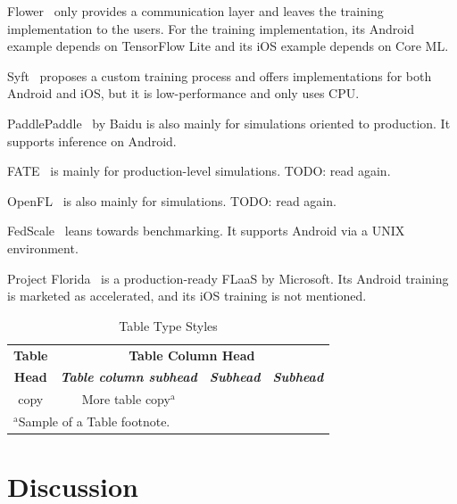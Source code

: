 \documentclass[conference]{IEEEtran}
\begin{document}
Flower~\cite{beutel2020flower,mathur2021ondevice}
only provides a communication layer and
leaves the training implementation to the users.
For the training implementation,
its Android example depends on TensorFlow Lite and
its iOS example depends on Core ML.

Syft~\cite{ryffel2018generic,Ziller2021,hall2021syft}
proposes a custom training process and
offers implementations for both Android and iOS,
but it is low-performance and only uses CPU.

PaddlePaddle~\cite{ma2019paddlepaddle} by Baidu is
also mainly for simulations oriented to production.
It supports inference on Android.

FATE~\cite{liu2021fate} is mainly for production-level simulations.
TODO: read again.

OpenFL~\cite{patrick2022openfl} is also mainly for simulations.
TODO: read again.

FedScale~\cite{lai2022fedscale} leans towards benchmarking.
It supports Android via a UNIX environment.

Project Florida~\cite{madrigal2023project}
is a production-ready FLaaS by Microsoft.
Its Android training is marketed as accelerated,
and its iOS training is not mentioned.


\begin{table}[htbp]
\caption{Table Type Styles}
\begin{center}
\begin{tabular}{|c|c|c|c|}
\hline
\textbf{Table}&\multicolumn{3}{|c|}{\textbf{Table Column Head}} \\
\cline{2-4} 
\textbf{Head} & \textbf{\textit{Table column subhead}}& \textbf{\textit{Subhead}}& \textbf{\textit{Subhead}} \\
\hline
copy& More table copy$^{\mathrm{a}}$& &  \\
\hline
\multicolumn{4}{l}{$^{\mathrm{a}}$Sample of a Table footnote.}
\end{tabular}
\label{tab1}
\end{center}
\end{table}

\section{Discussion}
\end{document}
